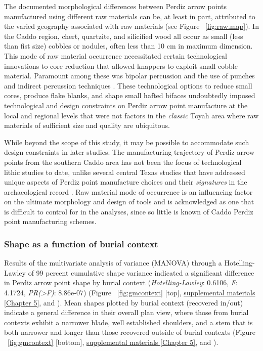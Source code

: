 \documentclass[review]{elsarticle}
\begin{document}
The documented morphological differences between Perdiz arrow points manufactured using different raw materials can be, at least in part, attributed to the varied geography associated with raw materials (see Figure ~\ref{fig:raw.map}). In the Caddo region, chert, quartzite, and silicified wood all occur as small (less than fist size) cobbles or nodules, often less than 10 cm in maximum dimension. This mode of raw material occurrence necessitated certain technological innovations to core reduction that allowed knappers to exploit small cobble material. Paramount among these was bipolar percussion and the use of punches and indirect percussion techniques \citep{RN8995,RN8996,RN8997,RN8998,RN2145}. These technological options to reduce small cores, produce flake blanks, and shape small hafted bifaces undoubtedly imposed technological and design constraints on Perdiz arrow point manufacture at the local and regional levels that were not factors in the \textit{classic} Toyah area where raw materials of sufficient size and quality are ubiquitous. 

While beyond the scope of this study, it may be possible to accommodate such design constraints in later studies. The manufacturing trajectory of Perdiz arrow points from the southern Caddo area has not been the focus of technological lithic studies to date, unlike several central Texas studies that have addressed unique aspects of Perdiz point manufacture choices and their \textit{signatures} in the archaeological record \citep{RN8999,RN9000}. Raw material mode of occurrence is an influencing factor on the ultimate morphology and design of tools and is acknowledged as one that is difficult to control for in the analyses, since so little is known of Caddo Perdiz point manufacturing schemes.

\subsubsection*{Shape as a function of burial context}

Results of the multivariate analysis of variance (MANOVA) through a Hotelling-Lawley of 99 percent cumulative shape variance indicated a significant difference in Perdiz arrow point shape by burial context (\textit{Hotelling-Lawley}: 0.6106, \textit{F}: 4.1724, \textit{PR(>F)}: 8.86e-07) (Figure ~\ref{fig:gmcontext} [top], \href{https://aksel-blaise.github.io/perdiz/elliptical-fourier-analysis.html}{supplemental materials [Chapter 5]}, and \citealt{RN8980}). Mean shapes plotted by burial context (recovered in/out) indicate a general difference in their overall plan view, where those from burial contexts exhibit a narrower blade, well established shoulders, and a stem that is both narrower and longer than those recovered outside of burial contexts (Figure ~\ref{fig:gmcontext} [bottom], \href{https://aksel-blaise.github.io/perdiz/elliptical-fourier-analysis.html}{supplemental materials [Chapter 5]}, and \citealt{RN8980}).
\end{document}
